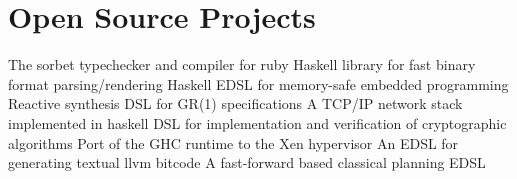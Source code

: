 \documentclass[letter,10pt]{moderncv}
\begin{document}
\section{Open Source Projects}
  {The sorbet typechecker and compiler for ruby}
  {Haskell library for fast binary format parsing/rendering}
  {Haskell EDSL for memory-safe embedded programming}
  {Reactive synthesis DSL for GR(1) specifications}
  {A TCP/IP network stack implemented in haskell}
  {DSL for implementation and verification of cryptographic algorithms}
  {Port of the GHC runtime to the Xen hypervisor}
  {An EDSL for generating textual llvm bitcode}
  {A fast-forward based classical planning EDSL}

\printbibliography[title=Publications]
\end{document}
